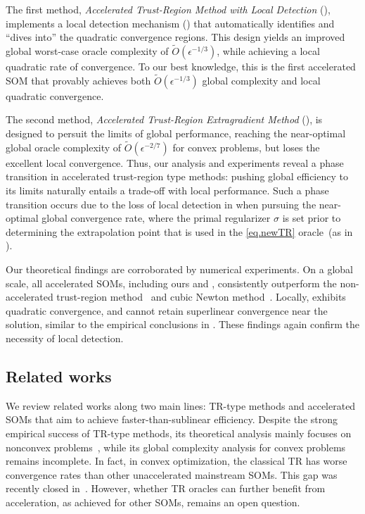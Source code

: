 The first method, \emph{Accelerated Trust-Region Method with Local Detection} (), implements a local detection mechanism () that automatically identifies and ``dives into'' the quadratic convergence regions. This design yields an improved global worst-case oracle complexity of $\tilde{O}(\epsilon^{-1/3})$, while achieving a local quadratic rate of convergence. To our best knowledge, this is the first accelerated SOM that provably achieves both $\tilde{O}(\epsilon^{-1/3})$ global complexity and local quadratic convergence. 

The second method, \emph{Accelerated Trust-Region Extragradient Method} (), is designed to persuit the limits of global performance, reaching the near-optimal global oracle complexity of $\tilde{O}(\epsilon^{-2/7})$ for convex problems, but loses the excellent local convergence. Thus, our analysis and experiments reveal a phase transition in accelerated trust-region type methods: pushing global efficiency to its limits naturally entails a trade-off with local performance. 
Such a phase transition occurs due to the loss of local detection in  when pursuing the near-optimal global convergence rate,
where the primal regularizer $\sigma$ is set prior to determining the extrapolation point that is used in the \ref{eq.newTR} oracle~(as in ).

Our theoretical findings are corroborated by numerical experiments. On a global scale, all accelerated SOMs, including ours and \cite{nesterov2008accelerating,monteiro2013accelerated}, consistently outperform the non-accelerated trust-region method~\cite{jiang2024nonconvexityuniversaltrustregionmethod} and cubic Newton method~\cite{nesterov2006cubic}. Locally,  exhibits quadratic convergence, and \atrms{} cannot retain superlinear convergence near the solution, similar to the empirical conclusions in \cite{carmon2022optimal,jiang2024accelerated,huang2024inexact}. These findings again confirm the necessity of local detection.

\subsection{Related works}
We review related works along two main lines: TR-type methods and accelerated SOMs that aim to achieve faster-than-sublinear efficiency. Despite the strong empirical success of TR-type methods, its theoretical analysis mainly focuses on nonconvex problems~\cite{yeSecondOrderOptimization2005,curtis2017trust,curtis2021trust,zhangHomogeneousSecondorderDescent2025,hamad2022consistently,grapiglia2015convergence,hamad2024simplepracticaladaptivetrustregion}, while  
its global complexity analysis for convex problems remains incomplete.
In fact, in convex optimization, the classical TR has worse convergence rates than other unaccelerated mainstream SOMs. This gap was recently closed in~\cite{jiang2024nonconvexityuniversaltrustregionmethod}. However, whether TR oracles can further benefit from acceleration, as achieved for other SOMs, remains an open question.

